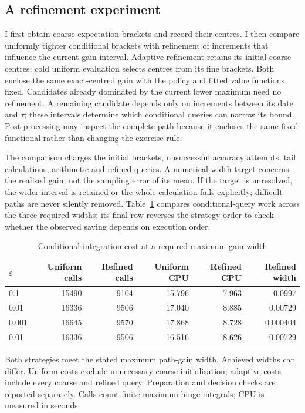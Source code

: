 \documentclass[11pt]{article}
\begin{document}
\subsection{A refinement experiment}

I first obtain coarse expectation brackets and record their centres. I then compare uniformly tighter conditional brackets with refinement of increments that influence the current gain interval. Adaptive refinement retains its initial coarse centres; cold uniform evaluation selects centres from its fine brackets. Both enclose the same exact-centred gain with the policy and fitted value functions fixed. Candidates already dominated by the current lower maximum need no refinement. A remaining candidate depends only on increments between its date and $\tau$; these intervals determine which conditional queries can narrow its bound. Post-processing may inspect the complete path because it encloses the same fixed functional rather than changing the exercise rule.

The comparison charges the initial brackets, unsuccessful accuracy attempts, tail calculations, arithmetic and refined queries. A numerical-width target concerns the realised gain, not the sampling error of its mean. If the target is unresolved, the wider interval is retained or the whole calculation fails explicitly; difficult paths are never silently removed. Table~\ref{tab:revision-certification} compares conditional-query work across the three required widths; its final row reverses the strategy order to check whether the observed saving depends on execution order.

\begin{table}[!htbp]
\centering\small
\caption{Conditional-integration cost at a required maximum gain width}\label{tab:revision-certification}
\begin{tabular}{@{}lrrrrr@{}}
\toprule
$\varepsilon$ & Uniform calls & Refined calls & Uniform CPU & Refined CPU & Refined width \\
\midrule
0.1 & 15490 & 9104 & 15.796 & 7.963 & 0.0997 \\
0.01 & 16336 & 9506 & 17.040 & 8.885 & 0.00729 \\
0.001 & 16645 & 9570 & 17.868 & 8.728 & 0.000404 \\
0.01 & 16336 & 9506 & 16.516 & 8.626 & 0.00729 \\
\bottomrule
\end{tabular}
\par\smallskip\begin{minipage}{\textwidth}\footnotesize Both strategies meet the stated maximum path-gain width. Achieved widths can differ. Uniform costs exclude unnecessary coarse initialisation; adaptive costs include every coarse and refined query. Preparation and decision checks are reported separately. Calls count finite maximum-hinge integrals; CPU is measured in seconds.\end{minipage}
\end{table}
\end{document}
